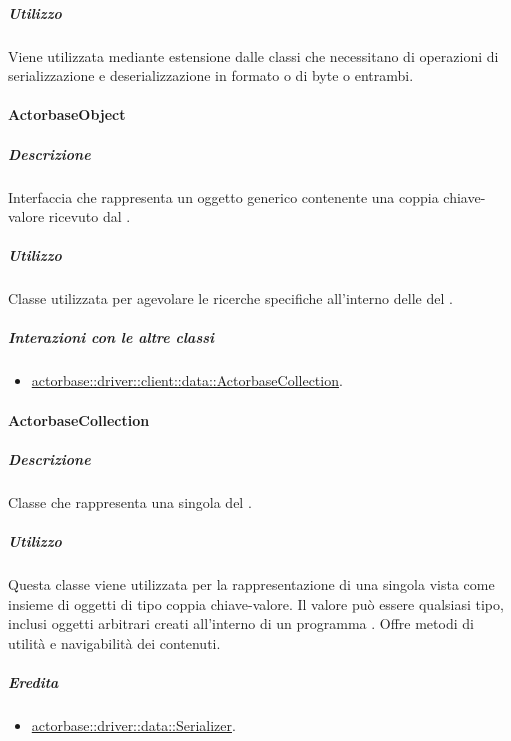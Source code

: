 \documentclass{scalatekids-article}
\begin{document}
\subparagraph{Utilizzo}

Viene utilizzata mediante estensione dalle classi che necessitano di operazioni di
serializzazione e deserializzazione in formato  o  di byte
o entrambi.

\paragraph{ActorbaseObject}
\label{sec:actorbase::driver::data::ActorbaseObject}

\subparagraph{Descrizione}

Interfaccia che rappresenta un oggetto generico contenente una coppia
chiave-valore ricevuto dal .

\subparagraph{Utilizzo}

Classe utilizzata per agevolare le ricerche specifiche all'interno delle
 del .

\subparagraph{Interazioni con le altre classi}

\begin{itemize}
\item \hyperref[sec:actorbase::driver::client::data::ActorbaseCollection]{actorbase::driver::client::data::ActorbaseCollection}.
\end{itemize}


\paragraph{ActorbaseCollection}
\label{sec:actorbase::driver::data::ActorbaseCollection}

\subparagraph{Descrizione}

Classe che rappresenta una singola  del .

\subparagraph{Utilizzo}

Questa classe viene utilizzata per la rappresentazione di una singola
 vista come insieme di oggetti di tipo coppia chiave-valore.
Il valore può essere qualsiasi tipo, inclusi oggetti arbitrari creati
all'interno di un programma . Offre metodi di utilità e
navigabilità dei contenuti.

\subparagraph{Eredita}

\begin{itemize}
\item \hyperref[sec:actorbase::driver::data::Serializer]{actorbase::driver::data::Serializer}.
\end{itemize}
\end{document}
